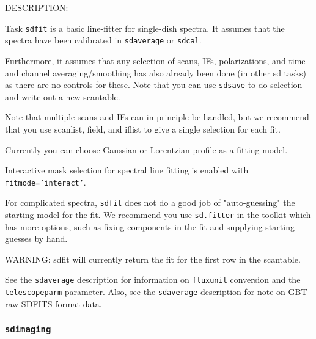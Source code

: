 DESCRIPTION:

Task {\tt sdfit} is a basic line-fitter for single-dish spectra.
It assumes that the spectra have been calibrated in {\tt sdaverage}
or {\tt sdcal}.

Furthermore, it assumes that any selection of scans, IFs,
polarizations, and time and channel averaging/smoothing has
also already been done (in other sd tasks) as there are no controls
for these.  Note that you can use {\tt sdsave} to do selection and write
out a new scantable.

Note that multiple scans and IFs can in principle be handled, but
we recommend that you use scanlist, field, and iflist to give a
single selection for each fit.

Currently you can choose Gaussian or Lorentzian profile as a fitting model.
    
Interactive mask selection for spectral line fitting is enabled with
{\tt fitmode='interact'}. 
    
For complicated spectra, {\tt sdfit} does not do a good job of
"auto-guessing" the starting model for the fit.  We recommend
you use {\tt sd.fitter} in the toolkit which has more options, such
as fixing components in the fit and supplying starting guesses
by hand.

WARNING: sdfit will currently return the fit for the first
row in the scantable.
    
See the {\tt sdaverage} description for information on {\tt fluxunit} 
conversion and the {\tt telescopeparm} parameter.
Also, see the {\tt sdaverage} description for note on GBT raw SDFITS format data.


\subsubsection{{\tt sdimaging}}
\label{section:sd.sdtasks.tasks.sdimaging}

